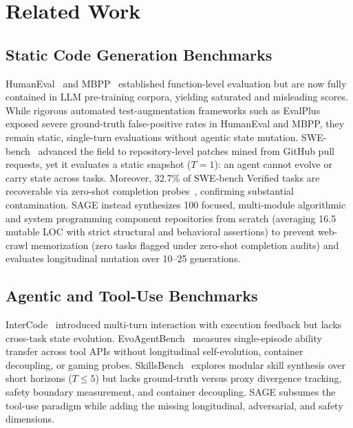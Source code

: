 \documentclass[conference]{IEEEtran}
\begin{document}
\section{Related Work}
\label{sec:related_work}

\subsection{Static Code Generation Benchmarks}
HumanEval~\cite{chen2021evaluating} and MBPP~\cite{austin2021program} established function-level evaluation but are now fully contained in LLM pre-training corpora, yielding saturated and misleading scores. While rigorous automated test-augmentation frameworks such as EvalPlus~\cite{liu2023evalplus} exposed severe ground-truth false-positive rates in HumanEval and MBPP, they remain static, single-turn evaluations without agentic state mutation. SWE-bench~\cite{jimenez2024swebench} advanced the field to repository-level patches mined from GitHub pull requests, yet it evaluates a static snapshot ($T=1$): an agent cannot evolve or carry state across tasks. Moreover, 32.7\% of SWE-bench Verified tasks are recoverable via zero-shot completion probes~\cite{openai2026swebenchleakage}, confirming substantial contamination. SAGE instead synthesizes 100 focused, multi-module algorithmic and system programming component repositories from scratch (averaging 16.5 mutable LOC with strict structural and behavioral assertions) to prevent web-crawl memorization (zero tasks flagged under zero-shot completion audits) and evaluates longitudinal mutation over 10--25 generations.

\subsection{Agentic and Tool-Use Benchmarks}
InterCode~\cite{yang2023intercode} introduced multi-turn interaction with execution feedback but lacks cross-task state evolution. EvoAgentBench~\cite{gao2026evoagentbench} measures single-episode ability transfer across tool APIs without longitudinal self-evolution, container decoupling, or gaming probes. SkillsBench~\cite{liu2026skillsbench} explores modular skill synthesis over short horizons ($T\le 5$) but lacks ground-truth versus proxy divergence tracking, safety boundary measurement, and container decoupling. SAGE subsumes the tool-use paradigm while adding the missing longitudinal, adversarial, and safety dimensions.
\end{document}
